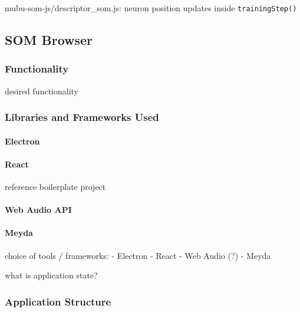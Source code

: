 \begin{listing}[!htb]
  \begin{mdframed}
    \inputminted[breaklines, numbers=left, firstline=306, lastline=312,
    fontsize=\footnotesize]{js}{../dev/mubu-som-js/descriptor_som.js}
  \end{mdframed}
  \caption{mubu-som-js/descriptor\_som.js: neuron position updates inside
  \texttt{trainingStep()}}
\end{listing}

\subsection{SOM Browser}
\label{subsec:implementation_som-browser}

\subsubsection{Functionality}
\label{subsubsec:som-browser_functionality}
desired functionality

\subsubsection{Libraries and Frameworks Used}
\label{subsubsec:som-browser_libraries}

\paragraph{Electron}
\label{para:electron}

\paragraph{React}
\label{para:react}
reference boilerplate project

\paragraph{Web Audio API}
\label{para:web_audio_api}

\paragraph{Meyda}
\label{para:meyda}

choice of tools / frameworks:
- Electron
- React
- Web Audio (?)
- Meyda

what is application state?

\subsubsection{Application Structure}
\label{subsubsec:som-browser_structure}

